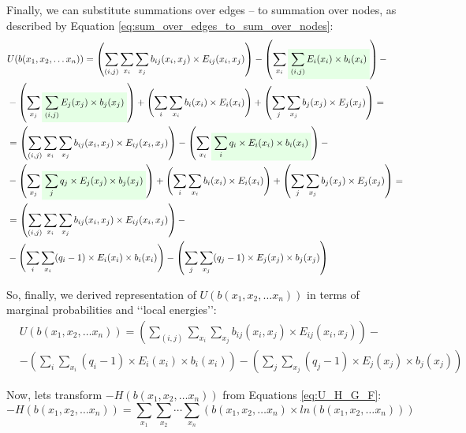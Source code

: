 \documentclass[fleqn,leqno]{article}
\newcommand{\highlight}[1]{\colorbox{green!10}{$\displaystyle#1$}}
\begin{document}
Finally, we can substitute summations over edges -- to summation over nodes, as described by Equation \eqref{eq:sum_over_edges_to_sum_over_nodes}:
\begin{equation}
\begin{split}
   & U(b(x_1,x_2,\dots x_n)) = \left( \sum_{(i, j)} \sum_{x_i} \sum_{x_j} b_{ij}(x_i, x_j) \times E_{ij}(x_i, x_j) \right) - \left( \sum_{x_i} \highlight{\sum_{(i, j)} E_i(x_i) \times b_i(x_i)} \right) - \\
   & -\left( \sum_{x_j} \highlight{\sum_{(i, j)} E_j(x_j) \times b_j(x_j)} \right) + \left( \sum_{i} \sum_{x_i} b_i(x_i) \times E_i(x_i) \right) + \left( \sum_{j} \sum_{x_j} b_j(x_j) \times E_j(x_j) \right) = \\
   & = \left( \sum_{(i, j)} \sum_{x_i} \sum_{x_j} b_{ij}(x_i, x_j) \times E_{ij}(x_i, x_j) \right) - \left( \sum_{x_i} \highlight{\sum_{i} q_i \times E_i(x_i) \times b_i(x_i)} \right) - \\
   & -\left( \sum_{x_j} \highlight{\sum_{j} q_j \times E_j(x_j) \times b_j(x_j)} \right) + \left( \sum_{i} \sum_{x_i} b_i(x_i) \times E_i(x_i) \right) + \left( \sum_{j} \sum_{x_j} b_j(x_j) \times E_j(x_j) \right) = \\
   & = \left( \sum_{(i, j)} \sum_{x_i} \sum_{x_j} b_{ij}(x_i, x_j) \times E_{ij}(x_i, x_j) \right) - \\ 
   & -\left( \sum_{i} \sum_{x_i} (q_i - 1) \times E_i(x_i) \times b_i(x_i) \right) -\left( \sum_{j} \sum_{x_j} (q_j - 1) \times E_j(x_j) \times b_j(x_j) \right)
\end{split}
\end{equation}

So, finally, we derived representation of $U(b(x_1,x_2,\dots x_n))$ in terms of marginal probabilities and \lq \lq local energies\rq \rq:
\begin{equation} \label{eq:U_in_terms_of_local_marginals_and_energies}
\begin{split}
   & U(b(x_1,x_2,\dots x_n)) = \left( \sum_{(i, j)} \sum_{x_i} \sum_{x_j} b_{ij}(x_i, x_j) \times E_{ij}(x_i, x_j) \right) - \\
   & -\left( \sum_{i} \sum_{x_i} (q_i - 1) \times E_i(x_i) \times b_i(x_i) \right) -\left( \sum_{j} \sum_{x_j} (q_j - 1) \times E_j(x_j) \times b_j(x_j) \right)
\end{split}
\end{equation}

Now, lets transform $-H(b(x_1,x_2,\dots x_n))$ from Equations \eqref{eq:U_H_G_F}:
\begin{equation} \label{eq:entropy_joint_probability}
-H(b(x_1,x_2,\dots x_n)) = \sum_{x_1} \sum_{x_2} \cdots \sum_{x_n} \left( b(x_1, x_2, \dots x_n) \times ln \left( b(x_1, x_2, \dots x_n) \right) \right)
\end{equation}
\end{document}
